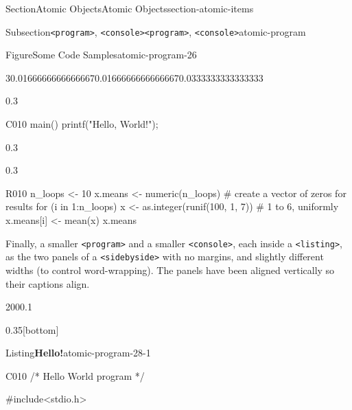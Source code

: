 \documentclass[twoside,10pt,]{article}
\newcommand{\mono}[1]{\texttt{#1}}
\numberwithin{equation}{section}
\newcommand{\consoleinput}[1]{\textbf{#1}}
\begin{document}
\begin{sectionptx}{Section}{Atomic Objects}{}{Atomic Objects}{}{}{section-atomic-items}
\begin{subsectionptx}{Subsection}{\mono{<program>}, \mono{<console>}}{}{\mono{<program>}, \mono{<console>}}{}{}{atomic-program}
\begin{figureptx}{Figure}{Some Code Samples}{atomic-program-26}{}
\begin{sidebyside}{3}{0.0166666666666667}{0.0166666666666667}{0.0333333333333333}
\begin{sbspanel}{0.3}
\begin{program}{C}{0}{1}{0}
main()
{
    printf("Hello, World!");
}
\end{program}
\end{sbspanel}%
\begin{sbspanel}{0.3}%
\end{sbspanel}%
\begin{sbspanel}{0.3}%
\begin{program}{R}{0}{1}{0}
n_loops <- 10
x.means <- numeric(n_loops)  # create a vector of zeros for results
for (i in 1:n_loops){
    x <- as.integer(runif(100, 1, 7))  # 1 to 6, uniformly
    x.means[i] <- mean(x)
}
x.means
\end{program}
\end{sbspanel}%
\end{sidebyside}%
\tcblower
\end{figureptx}%
Finally, a smaller \mono{<program>} and a smaller \mono{<console>}, each inside a \mono{<listing>}, as the two panels of a \mono{<sidebyside>} with no margins, and slightly different widths (to control word-wrapping).  The panels have been aligned vertically so their captions align.%
\begin{sidebyside}{2}{0}{0}{0.1}%
\begin{sbspanel}{0.35}[bottom]%
\begin{panellistingptx}{Listing}{\textbf{Hello!}}{atomic-program-28-1}{}%
\begin{program}{C}{0}{1}{0}
/* Hello World program */

#include<stdio.h>


\end{program}
\end{panellistingptx}
\end{sbspanel}
\end{sidebyside}
\end{subsectionptx}
\end{sectionptx}
\end{document}
